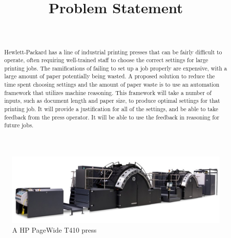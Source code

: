 \documentclass[draftclsnofoot,onecolumn,10pt]{IEEEtran}
\begin{document}
\title{Problem Statement}
\author{\\
}

\maketitle

\bigskip
\bigskip
\bigskip
\begin{figure}[H]
    \centering
    \captionsetup{justification=centering}
    \includegraphics[width=15cm]{HP-T410}
    \caption{A HP PageWide T410 press \cite{press}}
    \label{fig:press}
\end{figure}

\bigskip
\bigskip
\begin{abstract}
Hewlett-Packard has a line of industrial printing presses that can be fairly difficult to operate, often requiring well-trained staff to choose the correct settings for large printing jobs. The ramifications of failing to set up a job properly are expensive, with a large amount of paper potentially being wasted. A proposed solution to reduce the time spent choosing settings and the amount of paper waste is to use an automation framework that utilizes machine reasoning. This framework will take a number of inputs, such as document length and paper size, to produce optimal settings for that printing job. It will provide a justification for all of the settings, and be able to take feedback from the press operator. It will be able to use the feedback in reasoning for future jobs. 
\end{abstract}

\pagebreak
\end{document}
